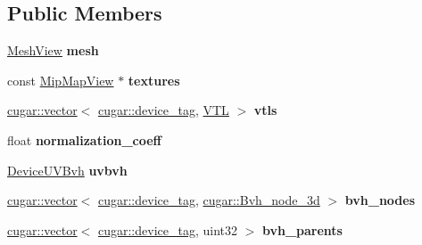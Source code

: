 \subsection*{Public Members}
\begin{DoxyCompactItemize}
\item 
\mbox{\label{struct_mesh_v_t_l_storage_impl_aadf81b3e06e1cf32999635e6e1d3156d}} 
\hyperlink{struct_mesh_view}{Mesh\+View} {\bfseries mesh}
\item 
\mbox{\label{struct_mesh_v_t_l_storage_impl_a3de1802b917295882ac94380dd3db321}} 
const \hyperlink{struct_mip_map_view}{Mip\+Map\+View} $\ast$ {\bfseries textures}
\item 
\mbox{\label{struct_mesh_v_t_l_storage_impl_a8fdd12300b29324e053d39d4955f8f45}} 
\hyperlink{structcugar_1_1vector}{cugar\+::vector}$<$ \hyperlink{structcugar_1_1device__tag}{cugar\+::device\+\_\+tag}, \hyperlink{struct_v_t_l}{V\+TL} $>$ {\bfseries vtls}
\item 
\mbox{\label{struct_mesh_v_t_l_storage_impl_aac016b1abacbed6e1a6af608388bcde0}} 
float {\bfseries normalization\+\_\+coeff}
\item 
\mbox{\label{struct_mesh_v_t_l_storage_impl_ad7713cbd22a0ab7ab3d369f0dff7a1a8}} 
\hyperlink{struct_u_v_bvh}{Device\+U\+V\+Bvh} {\bfseries uvbvh}
\item 
\mbox{\label{struct_mesh_v_t_l_storage_impl_abc09a1d2e48705cdb3b3b7fe14fde569}} 
\hyperlink{structcugar_1_1vector}{cugar\+::vector}$<$ \hyperlink{structcugar_1_1device__tag}{cugar\+::device\+\_\+tag}, \hyperlink{structcugar_1_1_bvh__node__3d}{cugar\+::\+Bvh\+\_\+node\+\_\+3d} $>$ {\bfseries bvh\+\_\+nodes}
\item 
\mbox{\label{struct_mesh_v_t_l_storage_impl_a4409fd4697cc4398e9c4c4632da9d18e}} 
\hyperlink{structcugar_1_1vector}{cugar\+::vector}$<$ \hyperlink{structcugar_1_1device__tag}{cugar\+::device\+\_\+tag}, uint32 $>$ {\bfseries bvh\+\_\+parents}
\item 
\mbox{\label{struct_mesh_v_t_l_storage_impl_af14169c8d22bd3611c29d27a4e1d2191}} 

\end{DoxyCompactItemize}
